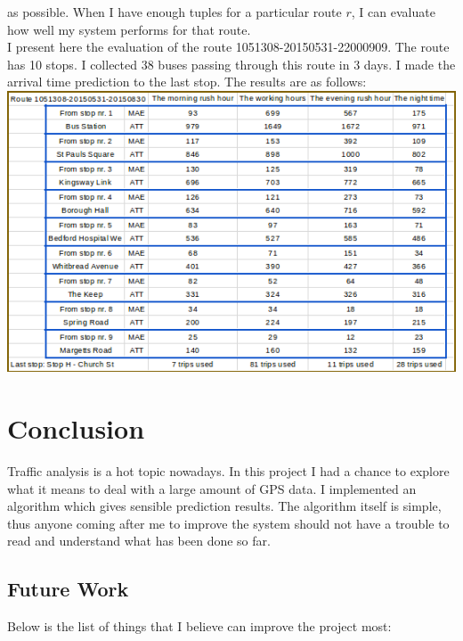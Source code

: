 \documentclass[12pt,a4paper,oneside,openright]{report}
\begin{document}
as possible. When I have enough tuples for a particular route $r$, I can evaluate
how well my system performs for that route. \\

I present here the evaluation of the route 1051308-20150531-22000909. The route has 10
stops. I collected $38$ buses passing through this route in 3 days. I made the arrival
time prediction to the last stop. The results are as follows: \\

\includegraphics[scale=1.0]{figs/table_of_1051308.png}

\chapter{Conclusion}

Traffic analysis is a hot topic nowadays. In this project I had a chance to explore what it
means to deal with a large amount of GPS data. I implemented an algorithm which gives
sensible prediction results. The algorithm itself is simple, thus anyone coming after me
to improve the system should not have a trouble to read and understand what has been done
so far. \\

\section{Future Work}

Below is the list of things that I believe can improve the project most:
\end{document}
